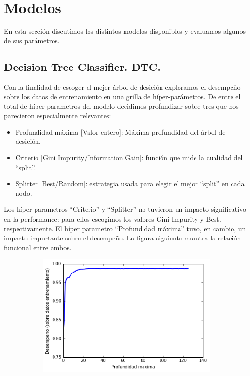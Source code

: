 \documentclass[a4paper,10pt]{article}
\begin{document}
\section{Modelos} \label{sec:modelos}

En esta secci\'on discutimos los distintos modelos disponibles y evaluamos algunos de sus par\'ametros.  

\subsection{Decision Tree Classifier. DTC.}

\par Con la finalidad de escoger el mejor árbol de desición exploramos 
el desempeño sobre los datos de entrenamiento en una grilla de híper-parámetros.
De entre el total de híper-parametros del modelo decidimos profundizar sobre 
tres que nos parecieron especialmente relevantes:
\begin{itemize}
 \item Profundidad máxima [Valor entero]: Máxima profundidad del árbol de desición. 
 \item Criterio [Gini Impurity/Information Gain]: función que mide la cualidad 
del ``split''. 
  \item Splitter [Best/Random]: estrategia usada para elegir el mejor 
``split'' en cada nodo.
\end{itemize}

Los híper-parametros ``Criterio'' y ``Splitter'' no tuvieron un impacto 
significativo en la performance; para ellos escogimos los valores Gini Impurity 
y Best, respectivamente.
El híper parametro ``Profundidad máxima'' tuvo, en cambio, un impacto 
importante sobre el desempeño. La figura siguiente muestra 
la relación funcional entre ambos.

  \begin{figure}[H]
    \centering
    \begin{subfigure}[b]{0.4\textwidth}
      \includegraphics[width=\textwidth]{../imagenes/desempeno-profundiad_arboles}
    \end{subfigure}
    \caption{}
    \label{fig:autovalores}
  \end{figure}
\end{document}
